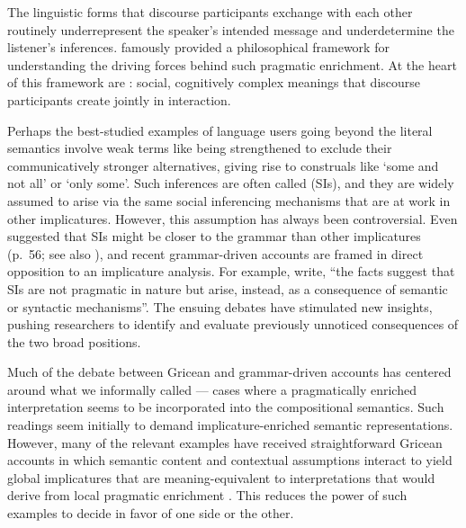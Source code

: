 \documentclass[leqno,12pt]{article}
\begin{document}
The linguistic forms that discourse participants exchange with each
other routinely underrepresent the speaker's intended message and
underdetermine the listener's inferences. \citet{Grice75} famously
provided a philosophical framework for understanding the driving
forces behind such pragmatic enrichment. At the heart of this
framework are : social, cognitively
complex meanings that discourse participants create jointly in
interaction.

Perhaps the best-studied examples of language users going beyond the
literal semantics involve weak terms like  being
strengthened to exclude their communicatively stronger alternatives,
giving rise to construals like `some and not all' or `only some'.
Such inferences are often called  (SIs), and they are widely assumed to arise via the
same social inferencing mechanisms that are at work in other
implicatures.  However, this assumption has always been
controversial. Even \citeauthor{Grice75} suggested that SIs might be
closer to the grammar than other implicatures (p.~56; see also
\citealt{Levinson00,Sperber95,Bach06}), and recent grammar-driven
accounts are framed in direct opposition to an implicature analysis.
For example,  write, ``the facts
suggest that SIs are not pragmatic in nature but arise, instead, as a
consequence of semantic or syntactic mechanisms''. The ensuing debates
have stimulated new insights, pushing researchers to identify and
evaluate previously unnoticed consequences of the two broad positions.

Much of the debate between Gricean and grammar-driven accounts has
centered around what we informally called 
--- cases where a pragmatically enriched interpretation seems to be
incorporated into the compositional semantics. Such readings seem
initially to demand implicature-enriched semantic representations.
However, many of the relevant examples have received straightforward
Gricean accounts in which semantic content and contextual assumptions
interact to yield global implicatures that are meaning-equivalent to
interpretations that would derive from local pragmatic enrichment
\citep{Russell06,Geurts09,Geurts:2011}. This reduces the power of such
examples to decide in favor of one side or the other.

\end{document}
